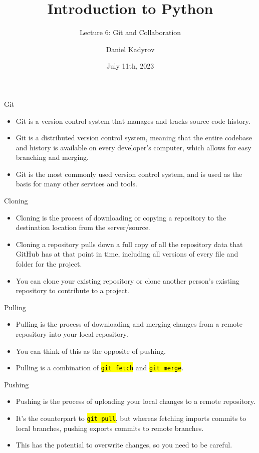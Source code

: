 \documentclass[
    aspectratio=169, 
    usepdftitle=false, 
    xcolor={dvipsnames},
    hyperref={
        colorlinks,
        linkcolor=black,
        urlcolor=blue}
    ]{beamer}
\title[Introduction to Python]{Introduction to Python}
\subtitle{Lecture 6: Git and Collaboration}
\author{Daniel Kadyrov}
\date{July 11th, 2023}
\let\OldTexttt\texttt
\renewcommand{\texttt}[1]{\OldTexttt{\hl{#1}}}%
\begin{document}
\begin{frame}
    \titlepage
\end{frame}

\begin{frame}{Git}
    \begin{itemize}
        \item Git is a version control system that manages and tracks source code history.
        \item Git is a distributed version control system, meaning that the entire codebase and history is available on every developer's computer, which allows for easy branching and merging.
        \item Git is the most commonly used version control system, and is used as the basis for many other services and tools.
    \end{itemize}
\end{frame}

\begin{frame}{Cloning}
    \begin{itemize}
        \item Cloning is the process of downloading or copying a repository to the destination location from the server/source.
        \item Cloning a repository pulls down a full copy of all the repository data that GitHub has at that point in time, including all versions of every file and folder for the project.
        \item You can clone your existing repository or clone another person's existing repository to contribute to a project.
    \end{itemize}
\end{frame}

\begin{frame}{Pulling}
    \begin{itemize}
        \item Pulling is the process of downloading and merging changes from a remote repository into your local repository.
        \item You can think of this as the opposite of pushing.
        \item Pulling is a combination of \texttt{git fetch} and \texttt{git merge}.
    \end{itemize}
\end{frame}

\begin{frame}{Pushing}
    \begin{itemize}
        \item Pushing is the process of uploading your local changes to a remote repository.
        \item It's the counterpart to \texttt{git pull}, but whereas fetching imports commits to local branches, pushing exports commits to remote branches.
        \item This has the potential to overwrite changes, so you need to be careful.
    \end{itemize}
\end{frame}
\end{document}
